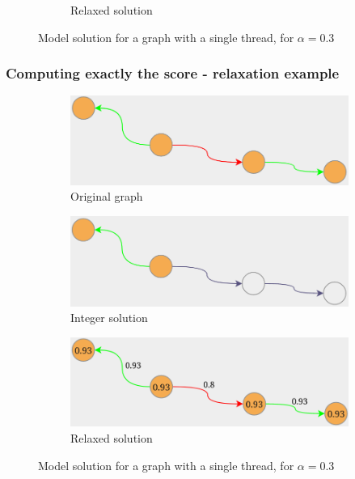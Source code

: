 \documentclass{beamer}
\begin{document}
\begin{frame}[c]
\begin{figure}
\begin{center}
\begin{subfigure}[b]{0.3\textwidth}
				\caption{Relaxed solution}
				\label{fig:img/graph-example3-3.png}
			\end{subfigure}
		\end{center}
		\caption{Model solution for a graph with a single thread, for $\alpha =
				0.3$}
	\end{figure}

\end{frame}

\begin{frame}[c]
	\frametitle{Computing exactly the score - relaxation example}
	\begin{figure}
		\begin{center}
			\begin{subfigure}[b]{0.3\textwidth}
				\centering
				\includegraphics[width=\textwidth]{img/graph-example4-1.png}
				\caption{Original graph}
				\label{fig:img/graph-example4-1.png}
			\end{subfigure}
			\begin{subfigure}[b]{0.3\textwidth}
				\centering
				\includegraphics[width=\textwidth]{img/graph-example4-2.png}
				\caption{Integer solution}
				\label{fig:img/graph-example4-2.png}
			\end{subfigure}
			\begin{subfigure}[b]{0.3\textwidth}
				\centering
				\includegraphics[width=\textwidth]{img/graph-example4-3.png}
				\caption{Relaxed solution}
				\label{fig:img/graph-example4-3.png}
			\end{subfigure}
		\end{center}
		\caption{Model solution for a graph with a single thread, for $\alpha =
				0.3$}
	\end{figure}

\end{frame}
\end{document}

